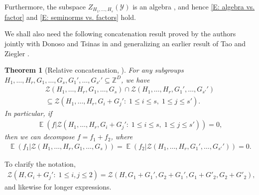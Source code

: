 \documentclass[11pt]{amsart}
\newtheorem{theorem}[lemma]{Theorem}
\theoremstyle{definition}
\DeclareMathOperator*{\E}{\mathbb{E}}
\newcommand{\Z}{{\mathbb Z}}
\newcommand{\CY}{{\mathcal Y}}
\newcommand{\CZ}{{\mathcal Z}}
\newcommand{\1}{{\mathbf{1}}}
\begin{document}
Furthermore, the subspace $Z_{H_1, \ldots, H_s}(\CY)$ is an algebra \cite[Proposition~2.3]{TZ16}, and hence \eqref{E: algebra vs. factor} and \eqref{E: seminorms vs. factors} hold.


 We shall also need the following concatenation result proved by the authors jointly with Donoso and Tsinas in \cite{DKKST25} and generalizing an earlier result of Tao and Ziegler \cite{TZ16}.
\begin{theorem}[Relative concatenation, {\cite[Theorem~3.1, Corollary 3.2]{DKKST25}}]\label{T: relative concatenation}
    For any subgroups $H_1, \ldots, H_r, G_1, \ldots, G_s, G_1', \ldots, G_{s'}'\subseteq \Z^D$, we have
\begin{multline*}%
    \CZ(H_1, \ldots, H_r, G_1, \ldots, G_s) \cap \CZ(H_1, \ldots, H_r, G_1', \ldots, G_{s'}')\\
    \subseteq \CZ(H_1, \ldots, H_r, G_i + G_j'\colon\; 1\leq i\leq s,\; 1\leq j\leq s').
\end{multline*}
In particular, if
\begin{align*}
    \E(f|\CZ(H_1, \ldots, H_r, G_i + G_j'\colon\; 1\leq i\leq s,\; 1\leq j\leq s')) = 0,
\end{align*}
then we can decompose $f = f_1 + f_2$, where
\begin{align*}
    \E(f_1|\CZ(H_1, \ldots, H_r, G_1, \ldots, G_s)) = \E(f_2|\CZ(H_1, \ldots, H_r, G_1', \ldots, G_{s'}')) = 0.
\end{align*}
\end{theorem}
To clarify the notation,
\begin{align*}
    \CZ(H, G_i + G_j'\colon\; 1\leq i,j\leq 2) = \CZ(H,G_1+G_1',G_2+G_1',G_1+G'_2,G_2+G'_2),
\end{align*}
and likewise for longer expressions.
\end{document}
